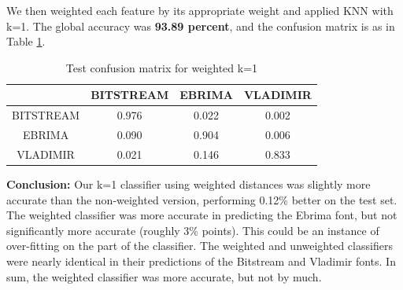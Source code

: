 \documentclass{homework}
\begin{document}
We then weighted each feature by its appropriate weight and applied KNN with k=1. The global accuracy was \textbf{93.89 percent}, and the confusion matrix is as in Table \ref{tab:Table 5}.
\begin{table}[H]
    \centering
    \begin{tabular}{c|ccc}
         &BITSTREAM&EBRIMA&VLADIMIR\\\hline
         BITSTREAM&0.976&0.022&0.002\\
         EBRIMA&0.090&0.904&0.006\\
         VLADIMIR&0.021&0.146&0.833
    \end{tabular}
    \caption{Test confusion matrix for weighted k=1}
    \label{tab:Table 5}
\end{table}
\textbf{Conclusion:} Our k=1 classifier using weighted distances was slightly more accurate than the non-weighted version, performing 0.12\% better on the test set. The weighted classifier was more accurate in predicting the Ebrima font, but not significantly more accurate (roughly 3\% points). This could be an instance of over-fitting on the part of the classifier. The weighted and unweighted classifiers were nearly identical in their predictions of the Bitstream and Vladimir fonts. In sum, the weighted classifier was more accurate, but not by much.

\newpage

\end{document}
